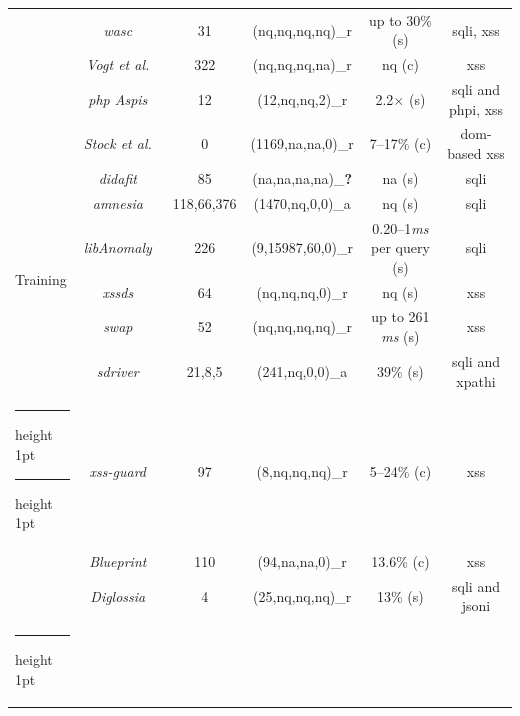 \documentclass[conference]{IEEEtran}
\makeatletter
\newcommand{\xmark}{\ding{56}}
\newcommand{\thickhline}{%
    \noalign {\ifnum 0=`}\fi \hrule height 1pt
    \futurelet \reserved@a \@xhline
}
\makeatother
\begin{document}
\begin{table}
\begin{threeparttable}
\begin{small}
{\begin{tabular}{l|c|c|cc|c}
  &   {\it {\sc wasc}}~\cite{NLC07} & 31 & ({\sc nq},{\sc nq},{\sc nq},{\sc nq})\_r & up to 30\% ({\sc s}) & {\sc sql}i, {\sc xss} \\
  &   {\it Vogt et al.}~\cite{VFJKKV07} & 322 & ({\sc nq},{\sc nq},{\sc nq},{\sc na})\_r & {\sc nq} ({\sc c}) & {\sc xss} \\
  &   {\it {\sc php} Aspis}~\cite{PMP11} & 12 & (12,{\sc nq},{\sc nq},2)\_r & 2.2$\times$ ({\sc s}) & {\sc sql}i and {\sc php}i, {\sc xss} \\
  &   {\it Stock et al.}~\cite{SLMS14} & 0 & (1169,{\sc na},{\sc na},0)\_r & 7--17\% ({\sc c}) & {\sc dom}-based {\sc xss} \\
  \hline 
  \multirow{6}{*}{Training}
  &   {\it {\sc didafit}}~\cite{LLW02} & 85 & ({\sc na},{\sc na},{\sc na},{\sc na})\_{\bf ?} & {\sc na} ({\sc s}) & {\sc sql}i \\
  &   {\it {\sc amnesia}}~\cite{HO05,HO06,HO05b} & 118,66,376 & (1470,{\sc nq},0,0)\_a & {\sc nq} ({\sc s}) & {\sc sql}i \\ 
  &   {\it libAnomaly}~\cite{VMV05} & 226 & (9,15987,60,0)\_r & 0.20--1{\it ms} per query ({\sc s}) & {\sc sql}i \\
  &   {\it {\sc xssds}}~\cite{JEP08} & 64 & ({\sc nq},{\sc nq},{\sc nq},0)\_r & {\sc nq} ({\sc s}) & {\sc xss} \\
  &   {\it {\sc swap}}~\cite{WPLKK09} & 52 & ({\sc nq},{\sc nq},{\sc nq},{\sc nq})\_r & up to 261 {\it ms} ({\sc s}) & {\sc xss} \\ 
  &   {\it {\sc sd}river}~\cite{MS09,MKS09,MKLS11} & 21,8,5 & (241,{\sc nq},0,0)\_a & 39\% ({\sc s}) & {\sc sql}i and {\sc xp}athi \\
  \thickhline
  \thickhline
  \multirow{3}{*}{Hybrid}
  &   {\it {\sc xss-guard}}~\cite{BV08} & 97 & (8,{\sc nq},{\sc nq},{\sc nq})\_r & 5--24\% ({\sc c}) & {\sc xss} \\
  &   {\it Blueprint}~\cite{LV09} & 110 & (94,{\sc na},{\sc na},0)\_r & 13.6\% ({\sc c}) & {\sc xss} \\
  &   {\it Diglossia}~\cite{SMS13} & 4 & (25,{\sc nq},{\sc nq},{\sc nq})\_r & 13\% ({\sc s}) & {\sc sql}i and {\sc json}i \\
  \thickhline
    \end{tabular}}
    \begin{tablenotes}
  \begin{footnotesize}

\end{footnotesize}
\end{tablenotes}
\end{small}
\end{threeparttable}
\end{table}
\end{document}
